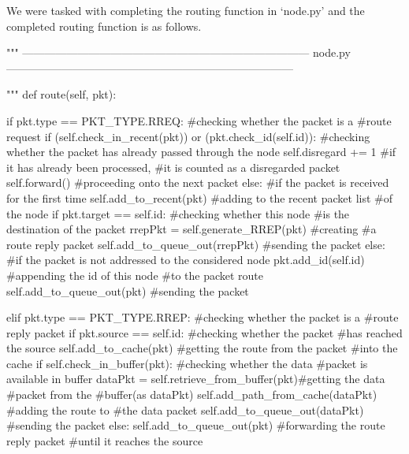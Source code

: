 \documentclass[a4paper,11pt]{article}%
\begin{document}
We were tasked with completing the routing function in ‘node.py’ and the completed routing function is as follows.\\

\begin{python}
	"""
	    ------------------------------------------------------------------------------
	    node.py
	    ------------------------------------------------------------------------------

	"""
	def route(self, pkt):

		 if pkt.type == PKT_TYPE.RREQ:    #checking whether the packet is a
																			#route request
				 if (self.check_in_recent(pkt)) or (pkt.check_id(self.id)):
					#checking whether the packet has already passed through the node
						 self.disregard += 1  #if it has already been processed,
																	#it is counted as a disregarded packet
						 self.forward()   #proceeding onto the next packet
				 else:    #if the packet is received for the first time
						 self.add_to_recent(pkt)      #adding to the recent packet list
																					#of the node
						 if pkt.target == self.id:    #checking whether this node
																					#is the destination of the packet
								 rrepPkt = self.generate_RREP(pkt)    #creating
																											#a route reply packet
								 self.add_to_queue_out(rrepPkt)   #sending the packet
						 else:    #if the packet is not addressed to the considered node
								 pkt.add_id(self.id)     #appending the id of this node
																				 #to the packet route
								 self.add_to_queue_out(pkt)   #sending the packet

		 elif pkt.type == PKT_TYPE.RREP:  #checking whether the packet is a
																			#route reply packet
				 if pkt.source == self.id:    #checking whether the packet
																			#has reached the source
						 self.add_to_cache(pkt)   #getting the route from the packet
																			#into the cache
						 if self.check_in_buffer(pkt):    #checking whether the data
																							#packet is available in buffer
								 dataPkt = self.retrieve_from_buffer(pkt)#getting the data
																												 #packet from the
																												 #buffer(as dataPkt)
								 self.add_path_from_cache(dataPkt)    #adding the route to
																											#the data packet
								 self.add_to_queue_out(dataPkt)   #sending the packet
				 else:
						 self.add_to_queue_out(pkt)   #forwarding the route reply packet
																					#until it reaches the source


\end{python}
\end{document}

